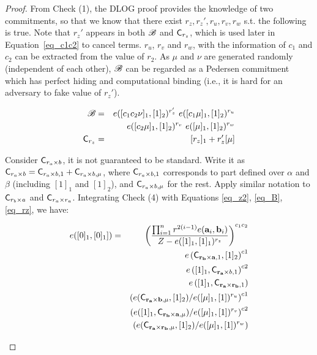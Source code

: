 \begin{proof}
From Check (1), the DLOG proof provides the knowledge
of two commitments, so that we know that there exist
$r_z, r_z', r_{u}, r_{v}, r_{w}$
s.t. the following is true. Note that 
$r_z'$ appears in both ${\mathscr{B}}$ and ${\mathsf{C}}_{r_z}$,
which is used later in Equation\ \ref{eq_c1c2}
to cancel terms. $r_{u}$, $r_v$ and $r_w$, with
the information of $c_1$ and $c_2$ can be extracted from
the value of $r_2$. As $\mu$ and $\nu$ are generated randomly (independent
of each other), ${\mathscr{B}}$ can be regarded as a Pedersen commitment
which has perfect hiding and computational binding (i.e.,
it is hard for an adversary to fake value of $r_z'$).
\begin{small}
\begin{eqnarray}
 {\mathscr{B}} &=& 
 	e([c_1c_2\nu]_1, [1]_2)^{r_z'} ~
 	e([c_1\mu]_1, [1]_2)^{r_u} \nonumber \\
	& &
 	e([c_2\mu]_1, [1]_2)^{r_v}~
 	e([\mu]_1, [1]_2)^{r_w} \label{eq_B} \\
 {\mathsf{C}}_{r_z} &=& [r_z]_1 + r_z'[\mu] \label{eq_rz}
\end{eqnarray}
\end{small}

Consider ${\mathsf{C}}_{r_a \times b}$, it is not guaranteed
to be standard. Write it as
${\mathsf{C}}_{r_a \times b} = {\mathsf{C}}_{r_a \times b, 1}
 + {\mathsf{C}}_{r_a \times b, \mu}$, where
 ${\mathsf{C}}_{r_a \times b, 1}$ corresponds to part
 defined over $\alpha$ and $\beta$ (including $[1]_1$
 and $[1]_2$), and
 ${\mathsf{C}}_{r_a \times b, \mu}$ for the rest.
Apply similar notation to
${\mathsf{C}}_{r_b \times a}$ and ${\mathsf{C}}_{r_a \times r_a}$.
Integrating Check (4) with
Equations \ref{eq_z2}, \ref{eq_B}, \ref{eq_rz}, we have:

\begin{small}
\begin{eqnarray} 
 e([0]_1,[0]_1]) &=& \left(\frac{\prod_{i=1}^n r^{2(i-1)}
 		e({{\mathbf {a}}}_i, {{\mathbf {b}}}_i)}
			{Z - e([1]_1, [1]_1)^{r_z} }\right)^{c_1 c_2} 
				\label{eq_c1c2} \\
	& & e\left({\mathsf{C}}_{{{\mathbf {r_b}}} \times {{\mathbf {a}}},1}, [1]_2\right)^{c1} \label{eq_c1} \\
	& & e\left([1]_1, {\mathsf{C}}_{{{\mathbf {r_a}}} \times b,1}\right)^{c2} \label{eq_c2} \\
	& & e\left([1]_1, {\mathsf{C}}_{{{\mathbf {r_a}}} \times {{\mathbf {r_b}}},1}\right) \label{eq_c3} \\
	& &
		\left(e({\mathsf{C}}_{{{\mathbf {r_a}}} \times {{\mathbf {b}}},\mu}, [1]_2) / e([\mu]_1, [1])^{r_u}\right)^{c1} \label{eq_c1mu} \\
	& &
		\left(e([1]_1, {\mathsf{C}}_{{{\mathbf {r_b}}} \times {{\mathbf {a}}},\mu}) / e([\mu]_1, [1])^{r_v}\right)^{c2} \label{eq_c2mu} \\
	& &
		\left(e({\mathsf{C}}_{{{\mathbf {r_a}}} \times {{\mathbf {r_b}}},\mu}, [1]_2) / e([\mu]_1, [1])^{r_w}\right) \label{eq_c3mu}
\end{eqnarray}
\end{small}


\end{proof}
